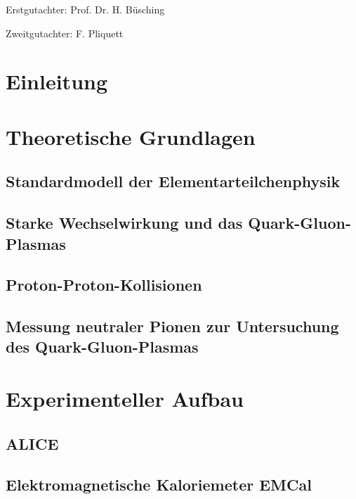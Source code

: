 \documentclass[a4paper,11pt,twoside]{report}
\author{Marvin Hemmer}
\renewcommand{\,}{,\!} %
\begin{document}
\begin{titlepage}
\begin{center}

\end{center}
\end{titlepage}
\newpage
\thispagestyle{empty}
\vspace*{\fill}
Erstgutachter: Prof. Dr. H. Büsching

Zweitgutachter: F. Pliquett
\newpage
\clearpage
\setcounter{page}{1}
\tableofcontents

\chapter*{Einleitung}


\chapter{Theoretische Grundlagen} \label{s1}

\section{Standardmodell der Elementarteilchenphysik} \label{s1s1}


\section{Starke Wechselwirkung und das Quark-Gluon-Plasmas} \label{s1s2}

\section{Proton-Proton-Kollisionen}\label{s1s3}


\section{Messung neutraler Pionen zur Untersuchung des Quark-Gluon-Plasmas} \label{s1s4}


\chapter{Experimenteller Aufbau} \label{s2}

\section{ALICE} \label{s2s1}

\section{Elektromagnetische Kaloriemeter EMCal} \label{s2s2}

\end{document}
